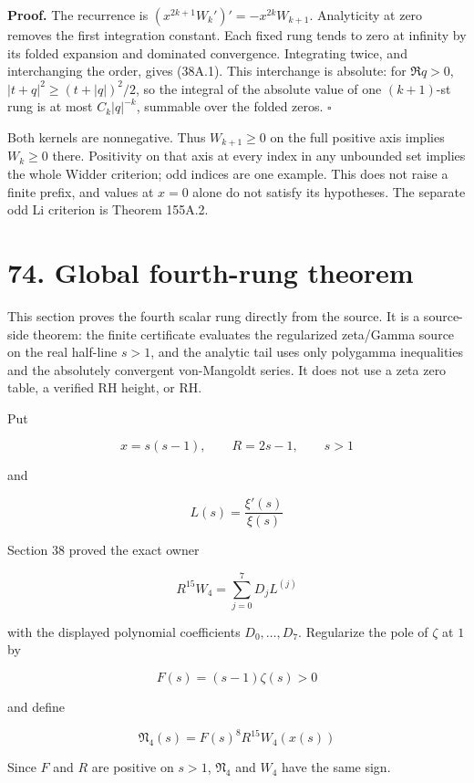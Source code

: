 \documentclass[
  11pt,
]{book}
\begin{document}
\textbf{Proof.} The recurrence is \((x^{2k+1}W_k')'=-x^{2k}W_{k+1}\).
Analyticity at zero removes the first integration constant. Each fixed
rung tends to zero at infinity by its folded expansion and dominated
convergence. Integrating twice, and interchanging the order, gives
(38A.1). This interchange is absolute: for \(\Re q>0\),
\(|t+q|^2\ge(t+|q|)^2/2\), so the integral of the absolute value of one
\((k+1)\)-st rung is at most \(C_k|q|^{-k}\), summable over the folded
zeros. \(\square\)

Both kernels are nonnegative. Thus \(W_{k+1}\ge0\) on the full positive
axis implies \(W_k\ge0\) there. Positivity on that axis at every index
in any unbounded set implies the whole Widder criterion; odd indices are
one example. This does not raise a finite prefix, and values at \(x=0\)
alone do not satisfy its hypotheses. The separate odd Li criterion is
Theorem 155A.2.

\section{74. Global fourth-rung
theorem}\label{global-fourth-rung-theorem}

This section proves the fourth scalar rung directly from the source. It
is a source-side theorem: the finite certificate evaluates the
regularized zeta/Gamma source on the real half-line \(s>1\), and the
analytic tail uses only polygamma inequalities and the absolutely
convergent von-Mangoldt series. It does not use a zeta zero table, a
verified RH height, or RH.

Put

\[
x=s(s-1),\qquad R=2s-1,\qquad s>1
\]

and

\[
L(s)=\frac{\xi'(s)}{\xi(s)}
\]

Section 38 proved the exact owner

\[
R^{15}W_4=\sum_{j=0}^{7}D_jL^{(j)}
\tag{74.1}
\]

with the displayed polynomial coefficients \(D_0,\ldots,D_7\).
Regularize the pole of \(\zeta\) at \(1\) by

\[
F(s)=(s-1)\zeta(s)>0
\]

and define

\[
\boxed{\mathfrak N_4(s)=F(s)^8R^{15}W_4(x(s))}
\tag{74.2}
\]

Since \(F\) and \(R\) are positive on \(s>1\), \(\mathfrak N_4\) and
\(W_4\) have the same sign.
\end{document}
